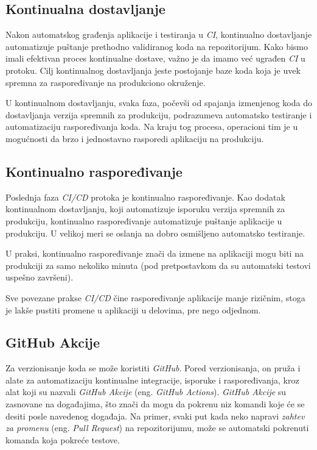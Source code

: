 \subsection{Kontinualna dostavljanje}
Nakon automatskog građenja aplikacije i testiranja u \textit{CI}, kontinualno dostavljanje automatizuje 
puštanje prethodno validiranog koda na repozitorijum. Kako bismo imali efektivan proces kontinualne 
dostave, važno je da imamo već ugrađen \textit{CI} u protoku. Cilj kontinualnog dostavljanja jeste postojanje 
baze koda koja je uvek spremna za raspoređivanje na produkciono okruženje.

U kontinualnom dostavljanju, svaka faza, počevši od spajanja izmenjenog koda do dostavljanja 
verzija spremnih za produkciju, podrazumeva automatsko testiranje i automatizaciju raspoređivanja 
koda. Na kraju tog procesa, operacioni tim je u mogućnosti da brzo i jednostavno rasporedi 
aplikaciju na produkciju.

\subsection{Kontinualno raspoređivanje}
Poslednja faza \textit{CI/CD} protoka je kontinualno raspoređivanje. Kao dodatak kontinualnom dostavljanju, 
koji automatizuje isporuku verzija spremnih za produkciju, kontinualno raspoređivanje automatizuje 
puštanje aplikacije u produkciju. U velikoj meri se oslanja na dobro osmišljeno automatsko testiranje.

U praksi, kontinualno raspoređivanje znači da izmene na aplikaciji mogu biti na produkciji za samo 
nekoliko minuta (pod pretpostavkom da su automatski testovi uspešno završeni).

Sve povezane prakse \textit{CI/CD} čine raspoređivanje aplikacije manje rizičnim, stoga je lakše pustiti 
promene u aplikaciji u delovima, pre nego odjednom.~\cite{CI_CD}

\subsection{GitHub Akcije}
Za verzionisanje koda se može koristiti \textit{GitHub}. Pored verzionisanja, on pruža i alate za automatizaciju 
kontinualne integracije, isporuke i raspoređivanja, kroz alat koji su nazvali \textit{GitHub Akcije} 
(eng. \textit{GitHub Actions}). 
\textit{GitHub Akcije} su zasnovane na događajima, što znači da mogu da pokrenu niz komandi koje će se desiti 
posle navedenog događaja. Na primer, svaki put kada neko napravi \textit{zahtev za promenu} 
(eng. \textit{Pull Request}) na repozitorijumu, može se automatski pokrenuti komanda koja pokreće 
testove. 

